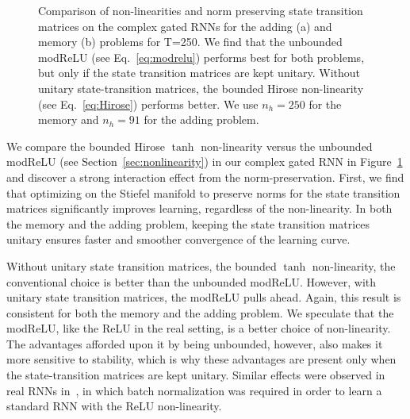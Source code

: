 \documentclass{article}
\begin{document}
\begin{figure}[t!]
    \centering
{}
\qquad
{}%
    
    \caption{\small Comparison of non-linearities and norm preserving state transition matrices on the complex gated RNNs for the adding (a) and memory (b) problems for T=250.  We find that the unbounded modReLU (see Eq.~\ref{eq:modrelu}) performs best for both problems, but only if the state transition matrices are kept unitary.  Without unitary state-transition matrices, the bounded Hirose non-linearity (see Eq.~\ref{eq:Hirose}) performs better. We use $n_h=250$ for the memory and $n_h=91$ for the adding problem.}
    \label{fig:complex_results}
    \vspace{-0.5cm}
\end{figure}

We compare the bounded Hirose $\tanh$ non-linearity versus the unbounded modReLU (see Section~\ref{sec:nonlinearity}) in our complex gated RNN in Figure~\ref{fig:complex_results} and discover a strong interaction effect from the norm-preservation.  First, we find that optimizing on the Stiefel manifold to preserve norms for the state transition matrices significantly improves learning, regardless of the non-linearity.  In both the memory and the adding problem, keeping the state transition matrices unitary ensures faster and smoother convergence of the learning curve. 

Without unitary state transition matrices, the bounded $\tanh$ non-linearity, \ie the conventional choice is better than the unbounded modReLU.  However, with unitary state transition matrices, the modReLU pulls ahead.  Again, this result is consistent for both the memory and the adding problem.  We speculate that the modReLU, like the ReLU in the real setting, is a better choice of non-linearity.  The advantages afforded upon it by being unbounded, however, also makes it more sensitive to stability, which is why these advantages are present only when the state-transition matrices are kept unitary.  Similar effects were observed in real RNNs in~\cite{Ravanelli2017ImprovingSR}, in which batch normalization was required in order to learn a standard RNN with the ReLU non-linearity.
\end{document}
